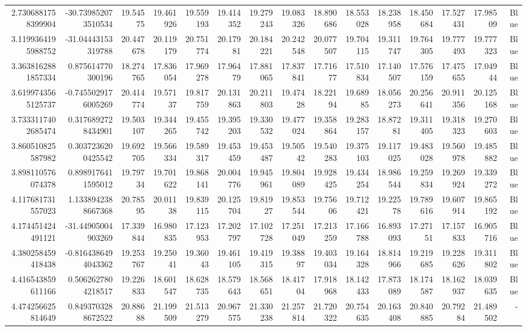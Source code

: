 \begin{center}
\begin{longtable}{rrrrrrrrrrrrrrr}
2.7306881758399904 & -30.739852073510534 & 19.54575 & 19.461926 & 19.559193 & 19.414352 & 19.279243 & 19.083326 & 18.890686 & 18.553028 & 18.238958 & 18.450684 & 17.527431 & 17.98509 & Blue \\
3.1199364195988752 & -31.04443153319788 & 20.447678 & 20.119179 & 20.751774 & 20.17981 & 20.184221 & 20.242548 & 20.077507 & 19.704115 & 19.311747 & 19.764305 & 19.777493 & 19.777323 & Blue \\
3.3638162881857334 & 0.875614770300196 & 18.274765 & 17.836054 & 17.969278 & 17.96479 & 17.881065 & 17.837841 & 17.71677 & 17.510834 & 17.140507 & 17.576159 & 17.475655 & 17.04944 & Blue \\
3.6199743565125737 & -0.7455029176005269 & 20.414774 & 19.57137 & 19.817759 & 20.131863 & 20.211803 & 19.47428 & 18.22194 & 19.68985 & 18.056273 & 20.256641 & 20.911356 & 20.125168 & Blue \\
3.7333117402685474 & 0.3176892728434901 & 19.503107 & 19.344265 & 19.455742 & 19.395203 & 19.330532 & 19.477024 & 19.358864 & 19.283157 & 18.87281 & 19.311405 & 19.318323 & 19.270603 & Blue \\
3.860510825587982 & 0.3037236200425542 & 19.692705 & 19.566334 & 19.589317 & 19.453459 & 19.453487 & 19.50542 & 19.540283 & 19.375103 & 19.117025 & 19.483028 & 19.560978 & 19.485882 & Blue \\
3.898110576074378 & 0.8989176411595012 & 19.79734 & 19.701622 & 19.868141 & 20.004776 & 19.945961 & 19.804089 & 19.928425 & 19.434254 & 18.986544 & 19.259834 & 19.269924 & 19.339272 & Blue \\
4.117681731557023 & 1.1338942388667368 & 20.78595 & 20.01138 & 19.839115 & 20.125704 & 19.81927 & 19.853544 & 19.75606 & 19.712421 & 19.22578 & 19.789616 & 19.607914 & 19.865192 & Blue \\
4.174451424491121 & -31.44905004903269 & 17.339844 & 16.980835 & 17.123953 & 17.202797 & 17.102728 & 17.251049 & 17.213259 & 17.166788 & 16.893093 & 17.27151 & 17.157833 & 16.905716 & Blue \\
4.380258459418438 & -0.8164386494043362 & 19.253767 & 19.25041 & 19.36043 & 19.461105 & 19.419315 & 19.38897 & 19.403034 & 19.164328 & 18.814966 & 19.219685 & 19.228626 & 19.311802 & Blue \\
4.416543859611166 & 0.5062627804218517 & 19.226833 & 18.601547 & 18.628735 & 18.579643 & 18.568651 & 18.41704 & 17.918968 & 18.142433 & 17.873089 & 18.174587 & 18.162937 & 18.039635 & Blue \\
4.474256625814649 & 0.8493703288672522 & 20.88688 & 21.199509 & 21.513279 & 20.967575 & 21.330238 & 21.257814 & 21.720322 & 20.754635 & 20.163408 & 20.840885 & 20.79284 & 21.489502 & - \\

\end{longtable}
\end{center}
